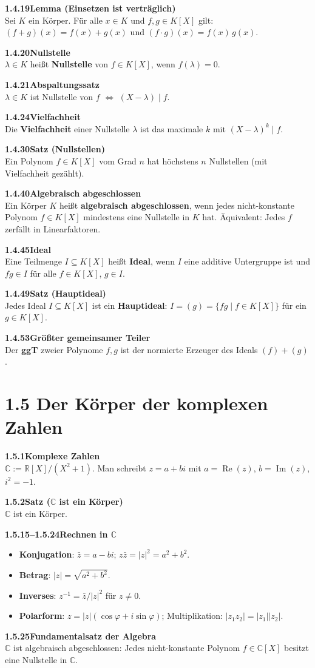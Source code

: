 \documentclass[a4paper,12pt]{article}
\newcommand{\gentry}[3]{%
  \noindent\textbf{#1\quad #2}\nopagebreak\\[0.2em]
  #3\par\smallskip
}
\begin{document}
\gentry{1.4.19}{Lemma (Einsetzen ist verträglich)}{%
  Sei $K$ ein Körper. Für alle $x \in K$ und $f, g \in K[X]$ gilt:
  $(f+g)(x) = f(x)+g(x)$ \quad und \quad $(f \cdot g)(x) = f(x)\,g(x)$.
}

\gentry{1.4.20}{Nullstelle}{%
  $\lambda \in K$ heißt \textbf{Nullstelle} von $f \in K[X]$, wenn $f(\lambda) = 0$.
}

\gentry{1.4.21}{Abspaltungssatz}{%
  $\lambda \in K$ ist Nullstelle von $f$ $\iff$ $(X - \lambda) \mid f$.
}

\gentry{1.4.24}{Vielfachheit}{%
  Die \textbf{Vielfachheit} einer Nullstelle $\lambda$ ist das maximale $k$ mit $(X-\lambda)^k \mid f$.
}

\gentry{1.4.30}{Satz (Nullstellen)}{%
  Ein Polynom $f \in K[X]$ vom Grad $n$ hat höchstens $n$ Nullstellen (mit Vielfachheit gezählt).
}

\gentry{1.4.40}{Algebraisch abgeschlossen}{%
  Ein Körper $K$ heißt \textbf{algebraisch abgeschlossen}, wenn jedes nicht-konstante Polynom $f \in K[X]$ mindestens eine Nullstelle in $K$ hat. Äquivalent: Jedes $f$ zerfällt in Linearfaktoren.
}

\gentry{1.4.45}{Ideal}{%
  Eine Teilmenge $I \subseteq K[X]$ heißt \textbf{Ideal}, wenn $I$ eine additive Untergruppe ist und $fg \in I$ für alle $f \in K[X]$, $g \in I$.
}

\gentry{1.4.49}{Satz (Hauptideal)}{%
  Jedes Ideal $I \subseteq K[X]$ ist ein \textbf{Hauptideal}: $I = (g) = \{fg \mid f \in K[X]\}$ für ein $g \in K[X]$.
}

\gentry{1.4.53}{Größter gemeinsamer Teiler}{%
  Der \textbf{ggT} zweier Polynome $f, g$ ist der normierte Erzeuger des Ideals $(f) + (g)$.
}

\section*{1.5 \quad Der Körper der komplexen Zahlen}

\gentry{1.5.1}{Komplexe Zahlen}{%
  $\mathbb{C} := \mathbb{R}[X]/(X^2+1)$. Man schreibt $z = a + bi$ mit $a = \operatorname{Re}(z)$, $b = \operatorname{Im}(z)$, $i^2 = -1$.
}

\gentry{1.5.2}{Satz ($\mathbb{C}$ ist ein Körper)}{$\mathbb{C}$ ist ein Körper.}

\gentry{1.5.15--1.5.24}{Rechnen in $\mathbb{C}$}{%
  \begin{itemize}[topsep=2pt,itemsep=1pt]
    \item \textbf{Konjugation}: $\bar{z} = a - bi$; \quad $z \bar{z} = |z|^2 = a^2 + b^2$.
    \item \textbf{Betrag}: $|z| = \sqrt{a^2+b^2}$.
    \item \textbf{Inverses}: $z^{-1} = \bar{z}/|z|^2$ für $z \neq 0$.
    \item \textbf{Polarform}: $z = |z|(\cos\varphi + i\sin\varphi)$; Multiplikation: $|z_1 z_2| = |z_1||z_2|$.
  \end{itemize}
}

\gentry{1.5.25}{Fundamentalsatz der Algebra}{%
  $\mathbb{C}$ ist algebraisch abgeschlossen: Jedes nicht-konstante Polynom $f \in \mathbb{C}[X]$ besitzt eine Nullstelle in $\mathbb{C}$.
}
\end{document}
